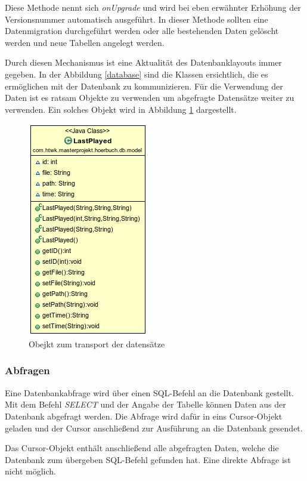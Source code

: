 Diese Methode nennt sich \textit{onUpgrade} und wird bei eben erwähnter Erhöhung der Versionsnummer automatisch ausgeführt. In dieser Methode sollten eine Datenmigration durchgeführt werden oder alle bestehenden Daten gelöscht werden und neue Tabellen angelegt werden.

Durch diesen Mechanismus ist eine Aktualität des Datenbanklayouts immer gegeben. In der Abbildung \ref{database} sind die Klassen ersichtlich, die es ermöglichen mit der Datenbank zu kommunizieren. Für die Verwendung der Daten ist es ratsam Objekte zu verwenden um abgefragte Datensätze weiter zu verwenden. Ein solches Objekt wird in Abbildung \ref{dbmodel} dargestellt.

\begin{figure}
\begin{center}
\includegraphics[scale=0.7]{images/dbmodel}
\caption{Obejkt zum transport der datensätze}
\label{dbmodel}
\end{center}
\end{figure}

\subsubsection{Abfragen}
Eine Datenbankabfrage wird über einen SQL-Befehl an die Datenbank gestellt. Mit dem Befehl \textit{SELECT} und der Angabe der Tabelle können Daten aus der Datenbank abgefragt werden. Die Abfrage wird dafür in eins Cursor-Objekt geladen und der Cursor anschließend zur Ausführung an die Datenbank gesendet.

Das Cursor-Objekt enthält anschließend alle abgefragten Daten, welche die Datenbank zum übergeben SQL-Befehl gefunden hat. Eine direkte Abfrage ist nicht möglich.

